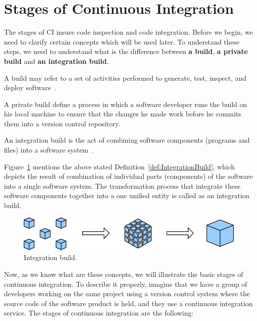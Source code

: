\section{Stages of Continuous Integration}

The stages of CI insure code inspection and code integration. Before we begin, we need to clarify certain concepts which will be used later. To understand these steps, we need to understand what is the difference between \textbf{a build}, \textbf{a private build} and \textbf{an integration build}.

\begin{DEF}
A build may refer to a set of activities performed to generate, test, inspect, and deploy software~\cite{CIbook}.
\end{DEF}

\begin{DEF}
A private build define a process in which a software developer runs the build on his local machine to ensure that the changes he made work before he commits them into a version control repository.
\end{DEF}

\begin{DEF}\label{def:IntegrationBuild}
An integration build is the act of combining software components (programs and files) into a software system~\cite{CIbook}.
\end{DEF}

Figure~\ref{fig:IntegrationBuild} mentions the above stated Definition~\ref{def:IntegrationBuild}, which depicts the result of combination of individual parts (components) of the software into a single software system. The transformation process that integrate these software components together into a one unified entity is called as an integration build.

\begin{figure}[H]
    \centering
    \includegraphics[scale=1]{img/system_integration.pdf}
    \caption{Integration build.}
    \label{fig:IntegrationBuild}
\end{figure}


Now, as we know what are these concepts, we will illustrate the basic stages of continuous integration. To describe it properly, imagine that we have a group of developers working on the same project using a version control system where the source code of the software product is held, and they use a continuous integration service. The stages of continuous integration are the following:

